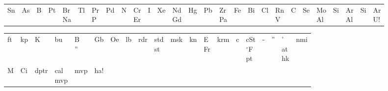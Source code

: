 \documentclass[a6paper, 10pt, twoside]{article}
\begin{document}
\begin{center}
\end{center}
\vspace{-10pt}
\begin{lyrics}
\begin{table}[!h]
\begin{tabularx}{0.8\textwidth}{X X X X X}
Sn&As&B&Pt&Br\physicalonly{\vspace{2pt} \\}
Na & Tl & Pr \physicalonly{\vspace{2pt} \\}
P & Pd & N & Cr\physicalonly{\vspace{2pt} \\}
Er & I & Xe & Nd\physicalonly{\vspace{2pt} \\}
Gd&Hg&Pb&Zr\physicalonly{\vspace{2pt} \\}
Pa&Fe&Bi&Cl&Rn\physicalonly{\vspace{2pt} \\}
V&C&Se&Mo\physicalonly{\vspace{2pt} \\}
Al &Si&Ar\physicalonly{\vspace{2pt} \\}
Al &Si&Ar\physicalonly{\vspace{2pt} \\}
U!
\end{tabularx}
\end{table}
\end{lyrics}
\vspace{-10pt}
\begin{center}
\end{center}
\vspace{-10pt}
\begin{lyrics}
\begin{table}[!h]
\begin{tabularx}{0.8\textwidth}{X X X X X X}
ft&kp&K&bu&B\physicalonly{\vspace{2pt} \\}
'' &Gb & Oe & lb&rdr&std \physicalonly{\vspace{2pt} \\}
st&msk&kn&E\physicalonly{\vspace{2pt} \\}
Fr&krm&c&cSt\physicalonly{\vspace{2pt} \\}
$^{\circ}$F\physicalonly{\vspace{2pt} \\}
pt&-&''&'\physicalonly{\vspace{2pt} \\}
at\physicalonly{\vspace{2pt} \\}
hk&nmi \\
M&Ci&dptr&cal\physicalonly{\vspace{2pt} \\}
mvp & mvp & ha!
\end{tabularx}
\end{table}
\end{lyrics}
\end{document}
